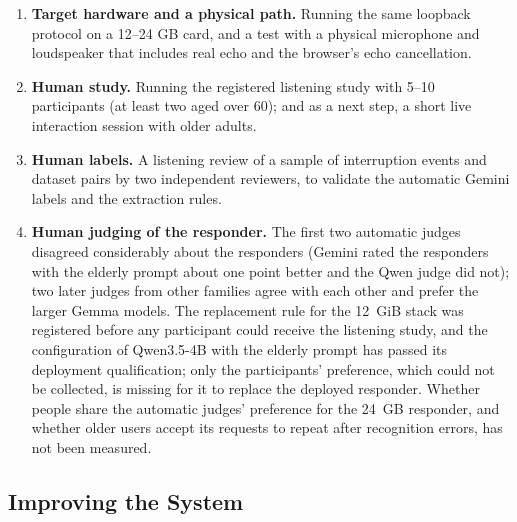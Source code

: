 \begin{enumerate}
\item \textbf{Target hardware and a physical path.} Running the same loopback protocol on a 12--24 GB
      card, and a test with a physical microphone and loudspeaker that includes real echo and the
      browser's echo cancellation.
\item \textbf{Human study.} Running the registered listening study with 5--10 participants (at least
      two aged over 60); and as a next step, a short live interaction session with older
      adults.
\item \textbf{Human labels.} A listening review of a sample of interruption events and dataset pairs by
      two independent reviewers, to validate the automatic Gemini labels and the extraction rules.
\item \textbf{Human judging of the responder.} The first two automatic judges disagreed considerably
      about the responders (Gemini rated the responders with the elderly prompt about one point better
      and the Qwen judge did not); two later judges from other families agree with each other and
      prefer the larger Gemma models. The replacement rule for the 12~GiB stack was registered before
      any participant could receive the listening study, and the configuration of Qwen3.5-4B with the elderly prompt has
      passed its deployment qualification; only the participants' preference, which could not be
      collected, is missing for it to replace the deployed responder. Whether people share the automatic judges' preference for the
      24~GB responder, and whether older users accept its requests to repeat after recognition
      errors, has not been measured.
\end{enumerate}

\subsection{Improving the System}


